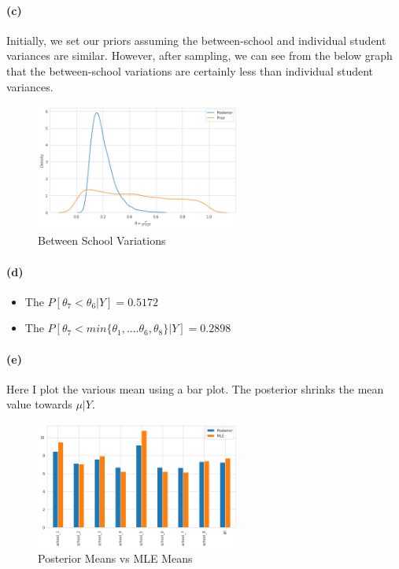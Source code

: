 \documentclass[11pt, letterpaper]{article}
\begin{document}
\newpage
\paragraph{(c)}
Initially, we set our priors assuming the between-school and individual student variances are similar. However, after sampling, we can see from the below graph that the between-school variations are certainly less than individual student variances.
\begin{figure}[!h]
  \centering
  \includegraphics[width=0.6\textwidth]{3.c.png}
  \captionsetup{justification=centering}
  \caption{Between School Variations}
\end{figure}

\paragraph{(d)}
\begin{itemize}
    \item The $P[\theta_7 < \theta_6|Y] = 0.5172$
    \item The $P[\theta_7 < min\{\theta_1, ....\theta_6, \theta_8\}|Y] = 0.2898$
\end{itemize}

\paragraph{(e)}
Here I plot the various mean using a bar plot. The posterior shrinks the mean value towards $\mu|Y$.
\begin{figure}[!h]
  \centering
  \includegraphics[width=0.6\textwidth]{3.d.png}
  \captionsetup{justification=centering}
  \caption{Posterior Means vs MLE Means}
\end{figure}
\end{document}
